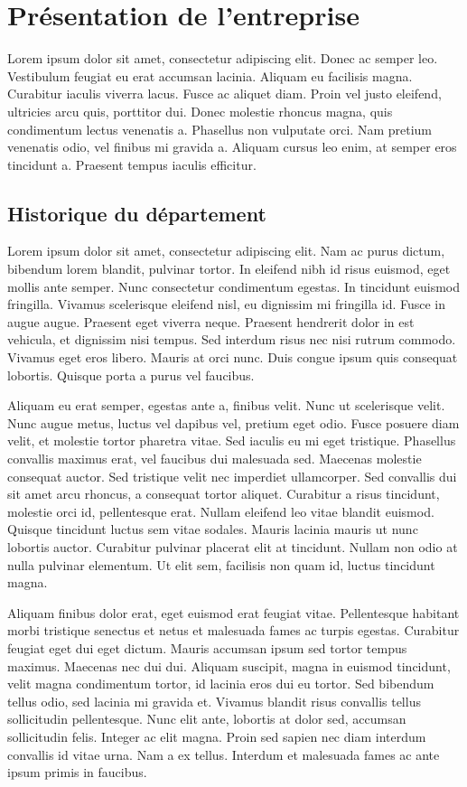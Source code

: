 \documentclass{report}
\begin{document}
\chapter{Présentation de l'entreprise}
Lorem ipsum dolor sit amet, consectetur adipiscing elit. Donec ac semper leo. Vestibulum feugiat eu erat accumsan lacinia. Aliquam eu facilisis magna. Curabitur iaculis viverra lacus. Fusce ac aliquet diam. Proin vel justo eleifend, ultricies arcu quis, porttitor dui. Donec molestie rhoncus magna, quis condimentum lectus venenatis a. Phasellus non vulputate orci. Nam pretium venenatis odio, vel finibus mi gravida a. Aliquam cursus leo enim, at semper eros tincidunt a. Praesent tempus iaculis efficitur.

\section{Historique du département}
Lorem ipsum dolor sit amet, consectetur adipiscing elit. Nam ac purus dictum, bibendum lorem blandit, pulvinar tortor. In eleifend nibh id risus euismod, eget mollis ante semper. Nunc consectetur condimentum egestas. In tincidunt euismod fringilla. Vivamus scelerisque eleifend nisl, eu dignissim mi fringilla id. Fusce in augue augue. Praesent eget viverra neque. Praesent hendrerit dolor in est vehicula, et dignissim nisi tempus. Sed interdum risus nec nisi rutrum commodo. Vivamus eget eros libero. Mauris at orci nunc. Duis congue ipsum quis consequat lobortis. Quisque porta a purus vel faucibus.

Aliquam eu erat semper, egestas ante a, finibus velit. Nunc ut scelerisque velit. Nunc augue metus, luctus vel dapibus vel, pretium eget odio. Fusce posuere diam velit, et molestie tortor pharetra vitae. Sed iaculis eu mi eget tristique. Phasellus convallis maximus erat, vel faucibus dui malesuada sed. Maecenas molestie consequat auctor. Sed tristique velit nec imperdiet ullamcorper. Sed convallis dui sit amet arcu rhoncus, a consequat tortor aliquet. Curabitur a risus tincidunt, molestie orci id, pellentesque erat. Nullam eleifend leo vitae blandit euismod. Quisque tincidunt luctus sem vitae sodales. Mauris lacinia mauris ut nunc lobortis auctor. Curabitur pulvinar placerat elit at tincidunt. Nullam non odio at nulla pulvinar elementum. Ut elit sem, facilisis non quam id, luctus tincidunt magna.

Aliquam finibus dolor erat, eget euismod erat feugiat vitae. Pellentesque habitant morbi tristique senectus et netus et malesuada fames ac turpis egestas. Curabitur feugiat eget dui eget dictum. Mauris accumsan ipsum sed tortor tempus maximus. Maecenas nec dui dui. Aliquam suscipit, magna in euismod tincidunt, velit magna condimentum tortor, id lacinia eros dui eu tortor. Sed bibendum tellus odio, sed lacinia mi gravida et. Vivamus blandit risus convallis tellus sollicitudin pellentesque. Nunc elit ante, lobortis at dolor sed, accumsan sollicitudin felis. Integer ac elit magna. Proin sed sapien nec diam interdum convallis id vitae urna. Nam a ex tellus. Interdum et malesuada fames ac ante ipsum primis in faucibus.
\end{document}
